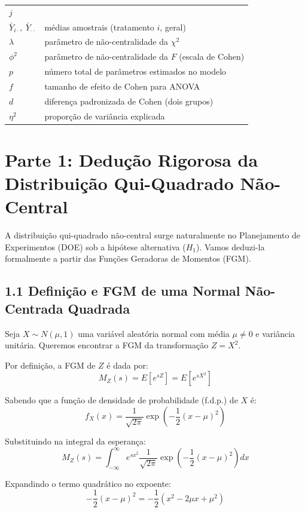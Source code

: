 \documentclass[
]{article}
\begin{document}
{\begin{longtable}[]{@{}
  >{\raggedright\arraybackslash}p{}
  >{\raggedright\arraybackslash}p{}@{}}
\(j\) \\
\(\bar Y_{i\cdot},\ \bar Y_{\cdot\cdot}\) & médias amostrais (tratamento
\(i\), geral) \\
\(\lambda\) & parâmetro de não-centralidade da \(\chi^2\) \\
\(\phi^2\) & parâmetro de não-centralidade da \(F\) (escala de Cohen) \\
\(p\) & número total de parâmetros estimados no modelo \\
\(f\) & tamanho de efeito de Cohen para ANOVA \\
\(d\) & diferença padronizada de Cohen (dois grupos) \\
\(\eta^2\) & proporção de variância explicada \\
\end{longtable}
}

\section{Parte 1: Dedução Rigorosa da Distribuição Qui-Quadrado
Não-Central}\label{parte-1-deduuxe7uxe3o-rigorosa-da-distribuiuxe7uxe3o-qui-quadrado-nuxe3o-central}

A distribuição qui-quadrado não-central surge naturalmente no
Planejamento de Experimentos (DOE) sob a hipótese alternativa (\(H_1\)).
Vamos deduzi-la formalmente a partir das Funções Geradoras de Momentos
(FGM).

\subsection{1.1 Definição e FGM de uma Normal Não-Centrada
Quadrada}\label{definiuxe7uxe3o-e-fgm-de-uma-normal-nuxe3o-centrada-quadrada}

Seja \(X \sim N(\mu, 1)\) uma variável aleatória normal com média
\(\mu \neq 0\) e variância unitária. Queremos encontrar a FGM da
transformação \(Z = X^2\).

Por definição, a FGM de \(Z\) é dada por:
\[M_Z(s) = E\left[ e^{sZ} \right] = E\left[ e^{sX^2} \right]\]

Sabendo que a função de densidade de probabilidade (f.d.p.) de \(X\) é:
\[f_X(x) = \frac{1}{\sqrt{2\pi}} \exp\left( -\frac{1}{2}(x - \mu)^2 \right)\]

Substituindo na integral da esperança:
\[M_Z(s) = \int_{-\infty}^{\infty} e^{sx^2} \frac{1}{\sqrt{2\pi}} \exp\left( -\frac{1}{2}(x - \mu)^2 \right) dx\]

Expandindo o termo quadrático no expoente:
\[-\frac{1}{2}(x - \mu)^2 = -\frac{1}{2}(x^2 - 2\mu x + \mu^2)\]
\end{document}

